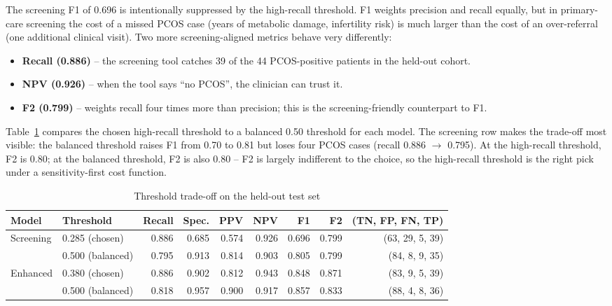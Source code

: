 \documentclass[11pt]{article}
\begin{document}
The screening F1 of 0.696 is intentionally suppressed by the high-recall threshold. F1 weights precision and recall equally, but in primary-care screening the cost of a missed PCOS case (years of metabolic damage, infertility risk) is much larger than the cost of an over-referral (one additional clinical visit). Two more screening-aligned metrics behave very differently:

\begin{itemize}
  \item \textbf{Recall (0.886)} -- the screening tool catches 39 of the 44 PCOS-positive patients in the held-out cohort.
  \item \textbf{NPV (0.926)} -- when the tool says ``no PCOS'', the clinician can trust it.
  \item \textbf{F2 (0.799)} -- weights recall four times more than precision; this is the screening-friendly counterpart to F1.
\end{itemize}

Table~\ref{tab:tradeoff} compares the chosen high-recall threshold to a balanced 0.50 threshold for each model. The screening row makes the trade-off most visible: the balanced threshold raises F1 from 0.70 to 0.81 but loses four PCOS cases (recall 0.886 $\to$ 0.795). At the high-recall threshold, F2 is 0.80; at the balanced threshold, F2 is also 0.80 -- F2 is largely indifferent to the choice, so the high-recall threshold is the right pick under a sensitivity-first cost function.

\begin{table}[H]
\centering
\caption{Threshold trade-off on the held-out test set}
\label{tab:tradeoff}
\begin{tabular}{llrrrrrrr}
\toprule
Model & Threshold & Recall & Spec. & PPV & NPV & F1 & F2 & (TN, FP, FN, TP) \\
\midrule
\multirow{2}{*}{Screening} & 0.285 (chosen) & 0.886 & 0.685 & 0.574 & 0.926 & 0.696 & 0.799 & (63, 29, 5, 39) \\
                          & 0.500 (balanced) & 0.795 & 0.913 & 0.814 & 0.903 & 0.805 & 0.799 & (84, 8, 9, 35) \\
\midrule
\multirow{2}{*}{Enhanced} & 0.380 (chosen) & 0.886 & 0.902 & 0.812 & 0.943 & 0.848 & 0.871 & (83, 9, 5, 39) \\
                          & 0.500 (balanced) & 0.818 & 0.957 & 0.900 & 0.917 & 0.857 & 0.833 & (88, 4, 8, 36) \\
\bottomrule
\end{tabular}
\end{table}
\end{document}
